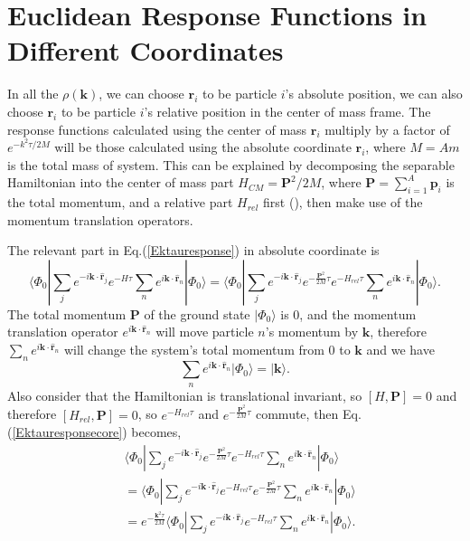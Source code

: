 \documentclass[12pt,letterpaper,UTF8]{report}
\begin{document}
{\section{Euclidean Response Functions in Different Coordinates}
\label{secResconvert}

In all the $\rho(\bm{k})$, we can choose $\bm{r}_i$ to be particle $i$'s absolute position, we can also choose $\bm{r}_i$ to be particle $i$'s relative position in the center of mass frame.
The response functions calculated using the center of mass $\bm{r}_i$ multiply by a factor of $e^{-k^2 \tau /2M}$ will be those calculated using the absolute coordinate $\bm{r}_i$, where $M=Am$ is the total mass of system. This can be explained by decomposing the separable Hamiltonian into the center of mass part $H_{CM}=\bm{P}^2/2M$, where $\bm{P}=\sum_{i=1}^{A}\bm{p}_i$ is the total momentum, and a relative part $H_{rel}$ first (\cite{messiah2014quantum}), then make use of the momentum translation operators.

The relevant part in Eq.(\ref{Ektauresponse}) in absolute coordinate is
\begin{equation}
\!\!\! \langle \Phi_0| \sum_j e^{-i \bm{k} \cdot \hat{\bm{r}}_j } e^{-H\tau} \sum_n e^{ i \bm{k} \cdot \hat{\bm{r}}_n } | \Phi_0 \rangle
= \langle \Phi_0| \sum_j e^{-i \bm{k} \cdot \hat{\bm{r}}_j } e^{- \frac{\bm{P}^2}{2M}\tau} e^{- H_{rel} \tau} \sum_n e^{ i \bm{k} \cdot \hat{\bm{r}}_n } | \Phi_0 \rangle.
\label{Ektauresponsecore}
\end{equation}
The total momentum $\bm{P}$ of the ground state $| \Phi_0 \rangle $  is 0, and the momentum translation operator $e^{ i \bm{k} \cdot \hat{\bm{r}}_n }$ will move particle $n$'s momentum by $\bm{k}$, therefore $\sum_{n}e^{ i \bm{k} \cdot \hat{\bm{r}}_n }$ will change the system's total momentum from 0 to $\bm{k}$ and we have
\begin{equation}
\sum_{n}e^{ i \bm{k} \cdot \hat{\bm{r}}_n } | \Phi_0 \rangle =| \bm{k} \rangle  .
\end{equation}
Also consider that the Hamiltonian is translational invariant, so $[H,\bm{P}]=0$ and therefore $[H_{rel},\bm{P}]=0$, so $e^{- H_{rel} \tau}$ and $e^{- \frac{\bm{P}^2}{2M}\tau}$ commute, then Eq.(\ref{Ektauresponsecore}) becomes,
\begin{align}
& \langle \Phi_0| \sum_j e^{-i \bm{k} \cdot \hat{\bm{r}}_j } e^{- \frac{\bm{P}^2}{2M}\tau} e^{- H_{rel} \tau} \sum_n e^{ i \bm{k} \cdot \hat{\bm{r}}_n } | \Phi_0 \rangle \nonumber \\
& = \langle \Phi_0| \sum_j e^{-i \bm{k} \cdot \hat{\bm{r}}_j } e^{- H_{rel} \tau} e^{- \frac{\bm{P}^2}{2M}\tau}  \sum_n e^{ i \bm{k} \cdot \hat{\bm{r}}_n } | \Phi_0 \rangle \nonumber \\
&= e^{- \frac{\bm{k}^2 \tau}{2M}}  \langle \Phi_0| \sum_j e^{-i \bm{k} \cdot \hat{\bm{r}}_j } e^{- H_{rel} \tau} \sum_n e^{ i \bm{k} \cdot \hat{\bm{r}}_n } | \Phi_0 \rangle  .
\label{responsecomp1}
\end{align}

}
\end{document}
